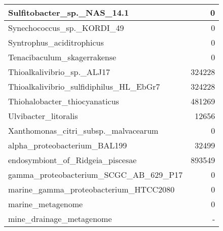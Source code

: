 \documentclass[12pt,a4paper]{article}
\begin{document}
\begin{table}[ht]
\begin{center}
\begin{tabular}{|l*{1}{|r}|}
Sulfitobacter\_sp.\_NAS\_14.1 & 0 \\ \hline
Synechococcus\_sp.\_KORDI\_49 & 0 \\ \hline
Syntrophus\_aciditrophicus & 0 \\ \hline
Tenacibaculum\_skagerrakense & 0 \\ \hline
Thioalkalivibrio\_sp.\_ALJ17 & 324228 \\ \hline
Thioalkalivibrio\_sulfidiphilus\_HL\_EbGr7 & 324228 \\ \hline
Thiohalobacter\_thiocyanaticus & 481269 \\ \hline
Ulvibacter\_litoralis & 12656 \\ \hline
Xanthomonas\_citri\_subsp.\_malvacearum & 0 \\ \hline
alpha\_proteobacterium\_BAL199 & 32499 \\ \hline
endosymbiont\_of\_Ridgeia\_piscesae & 893549 \\ \hline
gamma\_proteobacterium\_SCGC\_AB\_629\_P17 & 0 \\ \hline
marine\_gamma\_proteobacterium\_HTCC2080 & 0 \\ \hline
marine\_metagenome & 0 \\ \hline
mine\_drainage\_metagenome & - \\ \hline
\end{tabular}
\end{center}
\end{table}
\end{document}
